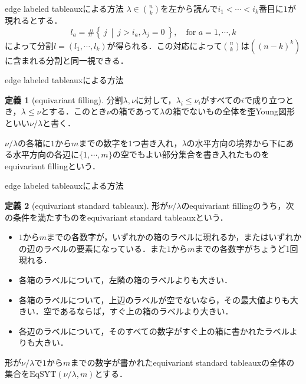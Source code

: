 \documentclass[unicode,12pt]{beamer}%
\theoremstyle{definition}
\newtheorem{defin}{定義}[section]
\theoremstyle{example}
\newcommand{\set}[2]{\left\{\:#1\:\middle|\:#2\:\right\}}
\begin{document}
\begin{frame}{edge labeled tableauxによる方法}
  $\lambda\in\binom{n}{k}$を左から読んで$i_1<\cdots<i_k$番目に$1$が現れるとする．
  \[
  l_a = \#\set{j}{j > i_a, \lambda_j = 0},\quad \text{for }a = 1,\cdots,k
  \]
  によって分割$l=(l_1,\cdots,l_k)$が得られる．この対応によって$\binom{n}{k}$は$((n-k)^k)$に含まれる分割と同一視できる．
  \begin{figure}
    \center
  \end{figure}
\end{frame}

\begin{frame}{edge labeled tableauxによる方法}
  \begin{defin}[equivariant filling]
    分割$\lambda, \nu$に対して，$\lambda_i\leq\nu_i$がすべての$i$で成り立つとき，$\lambda\leq\nu$とする．このとき$\nu$の箱であって$\lambda$の箱でないもの全体を歪Young図形といい$\nu/\lambda$と書く．

  $\nu/\lambda$の各箱に$1$から$m$までの数字を$1$つ書き入れ，$\lambda$の水平方向の境界から下にある水平方向の各辺に$\{1,\cdots,m\}$の空でもよい部分集合を書き入れたものをequivariant fillingという．
  \end{defin}
\end{frame}

\begin{frame}{edge labeled tableauxによる方法}
  \footnotesize
  \begin{defin}[equivariant standard tableaux]
    形が$\nu/\lambda$のequivariant fillingのうち，次の条件を満たすものをequivariant standard tableauxという．
  \begin{itemize}
    \item $1$から$m$までの各数字が，いずれかの箱のラベルに現れるか，またはいずれかの辺のラベルの要素になっている．また$1$から$m$までの各数字がちょうど1回現れる．
    \item 各箱のラベルについて，左隣の箱のラベルよりも大きい．
    \item 各箱のラベルについて，上辺のラベルが空でないなら，その最大値よりも大きい．空であるならば，すぐ上の箱のラベルより大きい．
    \item 各辺のラベルについて，そのすべての数字がすぐ上の箱に書かれたラベルよりも大きい．
  \end{itemize}
  形が$\nu/\lambda$で$1$から$m$までの数字が書かれたequivariant standard tableauxの全体の集合を$\text{EqSYT}(\nu/\lambda, m)$とする．
  \end{defin}
  \normalsize
\end{frame}
\end{document}
